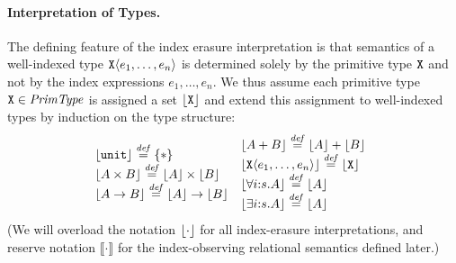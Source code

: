 
\paragraph{Interpretation of Types.}

The defining feature of the index erasure interpretation is that 
semantics of a well-indexed type $\textup{\texttt{X}}\langle e_1,\ldots,e_n \rangle$ is
determined solely by the primitive type $\textup{\texttt{X}}$ and not by the
index expressions $e_1,\ldots,e_n$. %
We thus assume each
primitive type $\textup{\texttt{X}} \in \mathit{PrimType}$ is assigned a set
$\left\lfloor \textup{\texttt{X}} \right\rfloor$ and %
extend this assignment to %
well-indexed types by induction on the type structure:
\begin{displaymath}
  \begin{array}{@{}c@{\hspace{0em}}c@{}}
    \begin{array}{@{}l}
      \tySem{\tyUnit} \isDefinedAs \{*\} \\
      \tySem{A \tyProduct B} \isDefinedAs \tySem{A} \times \tySem{B} \\
      \tySem{A \tyArr B} \isDefinedAs \tySem{A} \to \tySem{B} \\
    \end{array}
    &
    \begin{array}{l}
      \tySem{A + B} \isDefinedAs \tySem{A} + \tySem{B} \\
      \tySem{\tyPrim{X}{e_1,\ldots,e_n}} \isDefinedAs \tyPrimSem{\tyPrimNm{X}} \\
      \tySem{\forall i\mathord:s. A} \isDefinedAs \tySem{A} \\
      \tySem{\exists i\mathord:s. A} \isDefinedAs \tySem{A}
    \end{array}
  \end{array}
\end{displaymath}
(We will overload the
notation $\left\lfloor{\cdot}\right\rfloor$ for all index-erasure interpretations, 
and reserve notation $\llbracket\cdot\rrbracket$ for the
index-observing relational semantics defined later.)

